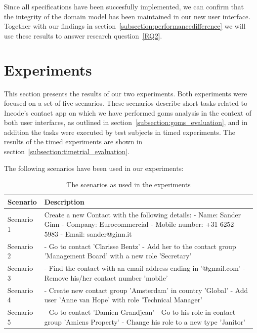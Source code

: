 Since all specifications have been succesfully implemented, we can confirm that the integrity of the domain model has been maintained in our new user interface. Together with our findings in section~\ref{subsection:performancedifference} we will use these results to answer research question~\ref{RQ2}.

\section{Experiments}
\label{section:experiments_evaluation}
This section presents the results of our two experiments. Both experiments were focused on a set of five scenarios. These scenarios describe short tasks related to Incode's contact app\cite{incod72:online} on which we have performed \acrshort{goms} analysis in the context of both user interfaces, as outlined in section~\ref{subsection:goms_evaluation}, and in addition the tasks were executed by test subjects in timed experiments. The results of the timed experiments are shown in section~\ref{subsection:timetrial_evaluation}.

The following scenarios have been used in our experiments:
\begin{table}[H]
	\center
	
	\begin{tabularx}{\textwidth}{lX}
		\toprule
		Scenario		&	Description \\
		\midrule
		Scenario 1	& Create a new Contact with the following details: \newline
								- Name: Sander Ginn \newline
								- Company: Eurocommercial \newline
								- Mobile number: +31 6252 5983 \newline
								- Email: sander@ginn.it \newline \\
		Scenario 2	& 	- Go to contact 'Clarisse Bentz' \newline
								- Add her to the contact group 'Management Board' with a new role 'Secretary' \newline \\
		Scenario 3	& 	- Find the contact with an email address ending in '@gmail.com' \newline
								- Remove his/her contact number 'mobile' \newline \\
		Scenario 4	&	- Create new contact group 'Amsterdam' in country 'Global' \newline
								- Add user 'Anne van Hope' with role 'Technical Manager' \newline \\
		Scenario 5	&	- Go to contact 'Damien Grandjean' \newline
								- Go to his role in contact group 'Amiens Property' \newline
								- Change his role to a new type 'Janitor'\\
		\bottomrule
	\end{tabularx}
	
	\caption{The scenarios as used in the experiments}
	\label{table:scenarios}
\end{table}


